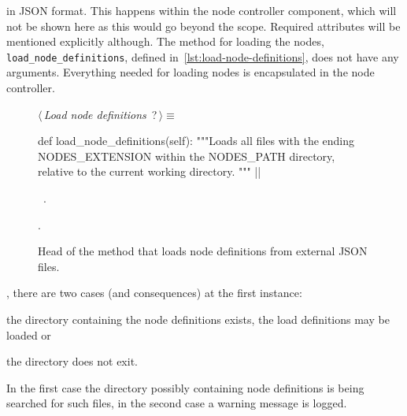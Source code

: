 \documentclass[%
    a4paper,    %
    justified,  %
    nobib,      %
    openany     %
]{tufte-book}
\makeatletter
\renewcommand{\label}[1]{\@tufte@label{##1}}%
\makeatother
\begin{document}
 in JSON format.
This happens within the node controller component, which will not be shown here
as this would go beyond the scope. Required attributes will be mentioned
explicitly although. The method for loading the nodes,
\texttt{load_node_definitions}, defined
in~\cref{lst:load-node-definitions}, does not have any arguments. Everything
needed for loading nodes is encapsulated in the node controller.

\begin{figure}[h]
  \begin{flushleft} \small
\begin{minipage}{\linewidth}\label{scrap3}\raggedright\small
{} $\langle\,${\itshape Load node definitions}\nobreak\ {\footnotesize {?}}$\,\rangle\equiv$
\vspace{-1ex}
\begin{pythoncode}
def load_node_definitions(self):
    """Loads all files with the ending NODES_EXTENSION
    within the NODES_PATH directory, relative to
    the current working directory.
    """
|\NWsep|
\end{pythoncode}
\vspace{1.5ex}
\footnotesize
\begin{list}{}{\setlength{\itemsep}{-\parsep}\setlength{\itemindent}{-\leftmargin}}
\item \NWtxtMacroDefBy\ .
\item {\NWtxtMacroNoRef}.

\item{}
\end{list}
\end{minipage}\vspace{4ex}
\end{flushleft}
\caption{Head of the method that loads node definitions from external JSON
    files.}
  \label{lst:load-node-definitions}
\end{figure}

, there are two cases (and
consequences) at the first instance:
\begin{enumerate*}
  \item the directory containing the node definitions exists, the load
    definitions may be loaded or
  \item the directory does not exit.
\end{enumerate*}
In the first case the directory possibly containing node definitions is being
searched for such files, in the second case a warning message is logged.
\end{document}
